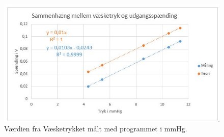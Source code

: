 \begin{figure}[H]
	\centering
	\includegraphics{Figurer/Hardware/VaesketrykUdgangsspaending}
	\caption{Værdien fra Væsketrykket målt med programmet i mmHg.}
	\label{fig:mmHgtryk}
\end{figure}